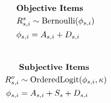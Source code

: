 \documentclass[12pt,preview,border=0]{standalone}
\begin{document}
$$
\begin{aligned} 
    & \text{\centering \textbf{Objective Items}} \\
    \hphantom{x} & R^s_{s,i}   \sim \text{Bernoulli}( \phi_{s,i} ) \\ 
	\hphantom{x} & \phi_{s,i}  =A_{s,i} + D_{s,i} 
\end{aligned}
$$
\\
$$
\begin{aligned}
    \hphantom{xxxx} & \text{\centering \textbf{Subjective Items}} \\
    R^o_{s,i}  & \sim \text{OrderedLogit}( \phi_{s,i}, \kappa ) \\ 
    \phi_{s,i} &  = A_{s,i} + S_s + D_{s,i}
\end{aligned}
$$
\end{document}
